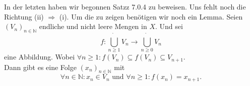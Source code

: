 \chapter{}
In der letzten haben wir begonnen Satzz 7.0.4 zu beweisen. 
Uns fehlt noch die Richtung (ii) $\Rightarrow$ (i).
Um die zu zeigen benötigen wir noch ein Lemma.
\mlenma{}
{
    Seien $(V_n)_{n \in \mathbb{N}}$ endliche und nicht leere Mengen in $X$. 
    Und sei 
    $$
    f: \dot{\bigcup_{n \geq 1}} V_n \to \dot{\bigcup_{n \geq 0}} V_n
    $$ eine Abbildung. 
    Wobei $\forall n \geq 1: f(V_n) \subseteq f(V_{n})\subseteq V_{n+1}$. \\
    Dann gibt es eine  Folge $(x_n)_{n \in \mathbb{N}}$ mit
    $$
    \forall n \in  \mathbb{N}: x_n \in V_n 
    \text{ und } \forall n \geq 1: f(x_n) = x_{n+1}.
    $$  
}


